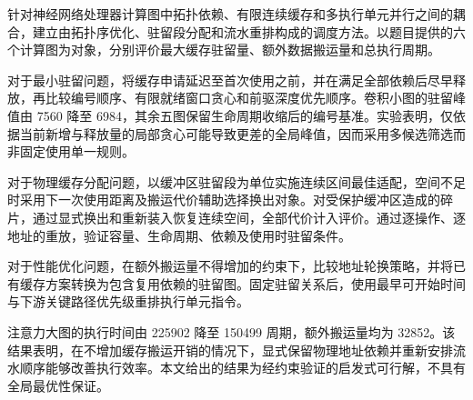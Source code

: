 针对神经网络处理器计算图中拓扑依赖、有限连续缓存和多执行单元并行之间的耦合，建立由拓扑序优化、驻留段分配和流水重排构成的调度方法。以题目提供的六个计算图为对象，分别评价最大缓存驻留量、额外数据搬运量和总执行周期。

对于最小驻留问题，将缓存申请延迟至首次使用之前，并在满足全部依赖后尽早释放，再比较编号顺序、有限就绪窗口贪心和前驱深度优先顺序。卷积小图的驻留峰值由 7560 降至 6984，其余五图保留生命周期收缩后的编号基准。实验表明，仅依据当前新增与释放量的局部贪心可能导致更差的全局峰值，因而采用多候选筛选而非固定使用单一规则。

对于物理缓存分配问题，以缓冲区驻留段为单位实施连续区间最佳适配，空间不足时采用下一次使用距离及搬运代价辅助选择换出对象。对受保护缓冲区造成的碎片，通过显式换出和重新装入恢复连续空间，全部代价计入评价。通过逐操作、逐地址的重放，验证容量、生命周期、依赖及使用时驻留条件。

对于性能优化问题，在额外搬运量不得增加的约束下，比较地址轮换策略，并将已有缓存方案转换为包含复用依赖的驻留图。固定驻留关系后，使用最早可开始时间与下游关键路径优先级重排执行单元指令。

注意力大图的执行时间由 225902 降至 150499 周期，额外搬运量均为 32852。该结果表明，在不增加缓存搬运开销的情况下，显式保留物理地址依赖并重新安排流水顺序能够改善执行效率。本文给出的结果为经约束验证的启发式可行解，不具有全局最优性保证。
